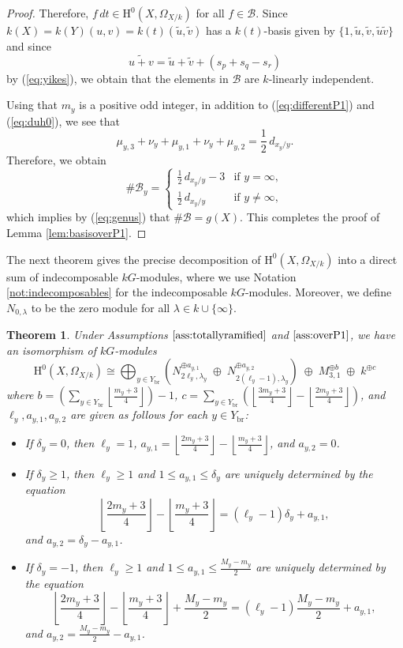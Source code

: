 \documentclass{amsart}
\numberwithin{equation}{section}
\numberwithin{table}{section}
\theoremstyle{plain}
\newtheorem{theorem}{Theorem}[section]
\theoremstyle{definition}
\theoremstyle{remark}
\newcommand{\HH}{\mathrm{H}}
\begin{document}
\begin{proof}
Therefore, $f\,dt\in \HH^0(X,\Omega_{X/k})$ for all $f\in\mathcal{B}$. Since $k(X)=k(Y)(u,v)=k(t)(\widetilde{u},\widetilde{v})$ has a $k(t)$-basis given by $\{1,\widetilde{u},\widetilde{v},\widetilde{u} \widetilde{v}\}$ and since 
$$\widetilde{u+v}=\widetilde{u}+\widetilde{v} + \left(s_p+s_q-s_r\right) $$
by (\ref{eq:yikes}), we obtain that the elements in $\mathcal{B}$ are $k$-linearly independent.  

Using that $m_y$ is a positive odd integer, in addition to (\ref{eq:differentP1}) and (\ref{eq:duh0}), we see that
$$\mu_{y,3}+\nu_y + \mu_{y,1}+\nu_y + \mu_{y,2} = \textstyle \frac{1}{2}\,d_{x_y/y}.$$
Therefore, we obtain
$$\#\mathcal{B}_y = \left\{ \begin{array}{cl}
\frac{1}{2}\,d_{x_y/y} - 3&\mbox{if $y=\infty$},\\
\frac{1}{2}\,d_{x_y/y}&\mbox{if $y\ne\infty$},
\end{array}\right. $$
which implies by (\ref{eq:genus}) that $\#\mathcal{B}=g(X)$. 
This completes the proof of Lemma \ref{lem:basisoverP1}.
\end{proof}

The next theorem gives the precise decomposition of $\HH^0(X,\Omega_{X/k})$ into a direct sum of indecomposable $kG$-modules, where we use Notation \ref{not:indecomposables}  for the indecomposable $kG$-modules. Moreover, we define $N_{0,\lambda}$ to be the zero module for all $\lambda\in k\cup\{\infty\}$.

\begin{theorem}
\label{thm:P1main}
Under Assumptions $\ref{ass:totallyramified}$ and $\ref{ass:overP1}$, we have an isomorphism of $kG$-modules
$$\HH^0(X,\Omega_{X/k})\cong \bigoplus_{y\in Y_{\mathrm{br}}} \left(N_{2\ell_y,\lambda_y}^{\oplus a_{y,1}}\;\oplus\; N_{2(\ell_y-1),\lambda_y}^{\oplus a_{y,2}}\right) \;\oplus\; M_{3,1}^{\oplus b} \;\oplus\; k^{\oplus c}$$
where $b=\left(\sum_{y\in Y_{\mathrm{br}}} \left\lfloor \frac{m_y+3}{4}\right\rfloor\right)-1$, $c= \sum_{y\in Y_{\mathrm{br}}} \left( \left\lfloor \frac{3m_y+3}{4}\right\rfloor - \left\lfloor \frac{2m_y+3}{4}\right\rfloor \right)$, and $\ell_y,a_{y,1},a_{y,2}$ are given as follows for each $y\in Y_{\mathrm{br}}$:
\begin{itemize}
\item[(i)] If $\delta_y=0$, then $\ell_y=1$, $a_{y,1}=\left\lfloor \frac{2m_y+3}{4}\right\rfloor - \left\lfloor \frac{m_y+3}{4}\right\rfloor$, and $a_{y,2}=0$. 
\item[(ii)] If $\delta_y\ge 1$, then $\ell_y\ge 1$ and $1\le a_{y,1}\le \delta_y$ are uniquely determined by the equation
$$\textstyle\left\lfloor \frac{2m_y+3}{4}\right\rfloor - \left\lfloor \frac{m_y+3}{4}\right\rfloor = (\ell_y-1) \delta_y +a_{y,1},$$
and $a_{y,2}=\delta_y-a_{y,1}$. 
\item[(iii)] If $\delta_y=-1$, then $\ell_y\ge 1$ and $1\le a_{y,1}\le \frac{M_y-m_y}{2}$ are uniquely determined by the equation
$$\textstyle \left\lfloor \frac{2m_y+3}{4}\right\rfloor - \left\lfloor \frac{m_y+3}{4}\right\rfloor + \frac{M_y-m_y}{2} = (\ell_y-1) \frac{M_y-m_y}{2} +a_{y,1},$$
and $a_{y,2}=\frac{M_y-m_y}{2}-a_{y,1}$. 
\end{itemize}
\end{theorem}
\end{document}
